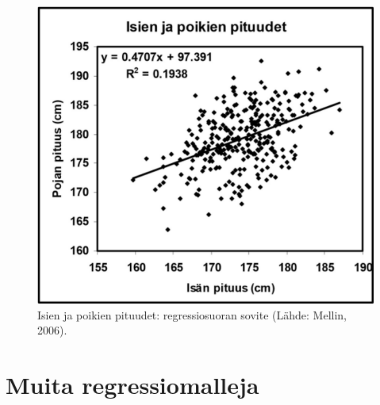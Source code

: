 \documentclass[
]{book}
\begin{document}
\begin{figure}

{\centering \includegraphics[width=1\linewidth]{images/Sovite-isien-poikien-pituudet-Mellin} 

}

\caption{Isien ja poikien pituudet: regressiosuoran sovite (Lähde: Mellin, 2006).}\label{fig:isatjapojat2}
\end{figure}

\hfill\break

\hypertarget{alaluku103}{%
\section{Muita regressiomalleja}\label{alaluku103}}
\end{document}
